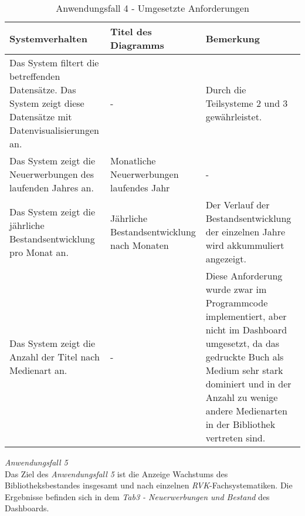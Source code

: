 \begingroup
    \setlength{\tabcolsep}{12pt} %
    \renewcommand{\arraystretch}{1.5} 
    \begin{table}[h]
        \centering
        \Large
        \begin{adjustbox}{max width=\textwidth}
        \begin{tabular}{p{}p{}p{}}
           \toprule
           Systemverhalten        &Titel des Diagramms &Bemerkung\\
           \midrule
           Das System filtert die betreffenden Datensätze. Das System zeigt diese Datensätze mit Datenvisualisierungen an.&-&Durch die Teilsysteme 2  und 3 gewährleistet.\\
           Das System zeigt die Neuerwerbungen des laufenden Jahres an.&Monatliche Neuerwerbungen laufendes Jahr&-\\
           Das System zeigt die jährliche Bestandsentwicklung pro Monat an.&Jährliche Bestandsentwicklung nach Monaten&Der Verlauf der Bestandsentwicklung der einzelnen Jahre wird akkummuliert angezeigt.\\
           Das System zeigt die Anzahl der Titel nach Medienart an.&-&Diese Anforderung wurde zwar im Programmcode implementiert, aber nicht im Dashboard umgesetzt, da das gedruckte Buch als Medium sehr stark dominiert und in der Anzahl zu wenige andere Medienarten in der Bibliothek vertreten sind.\\

        \bottomrule
        \end{tabular}
        \end{adjustbox}
        \caption{%
            Anwendungsfall 4 - Umgesetzte Anforderungen
        }
        \label{tab:Anwendungsfall 4 - Umgesetzte Anforderungen}
        \end{table}
\endgroup

\clearpage
\noindent
\textit{Anwendungsfall 5}\\
Das Ziel des \textit{Anwendungsfall 5} ist die Anzeige Wachstums des Bibliotheksbestandes insgesamt und nach einzelnen \textit{\acrshort{RVK}}-Fachsystematiken.
Die Ergebnisse befinden sich in dem \textit{Tab3 - Neuerwerbungen und Bestand} des Dashboards.

